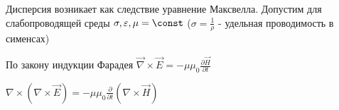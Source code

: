 

Дисперсия возникает как следствие уравнение Максвелла. Допустим для слабопроводящей среды $\sigma, \varepsilon, \mu = \const$ ($\sigma = \frac{1}{\rho}$ - удельная проводимость в сименсах)

По закону индукции Фарадея $\vec\nabla \times \vec E = -\mu\mu_0 \frac{\partial \vec H}{\partial t}$

$\nabla \times (\nabla \times \vec E) = -\mu\mu_0 \frac{\partial}{\partial t} (\nabla \times \vec H)$

